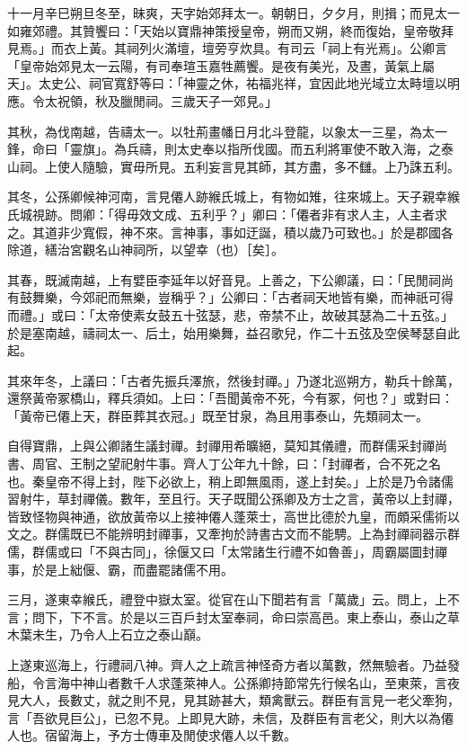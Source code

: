 \begin{pinyinscope}
十一月辛巳朔旦冬至，昧爽，天字始郊拜太一。朝朝日，夕夕月，則揖；而見太一如雍郊禮。其贊饗曰：「天始以寶鼎神策授皇帝，朔而又朔，終而復始，皇帝敬拜見焉。」而衣上黃。其祠列火滿壇，壇旁亨炊具。有司云「祠上有光焉」。公卿言「皇帝始郊見太一云陽，有司奉瑄玉嘉牲薦饗。是夜有美光，及晝，黃氣上屬天」。太史公、祠官寬舒等曰：「神靈之休，祐福兆祥，宜因此地光域立太畤壇以明應。令太祝領，秋及臘閒祠。三歲天子一郊見。」

其秋，為伐南越，告禱太一。以牡荊畫幡日月北斗登龍，以象太一三星，為太一鋒，命曰「靈旗」。為兵禱，則太史奉以指所伐國。而五利將軍使不敢入海，之泰山祠。上使人隨驗，實毋所見。五利妄言見其師，其方盡，多不讎。上乃誅五利。

其冬，公孫卿候神河南，言見僊人跡緱氏城上，有物如雉，往來城上。天子親幸緱氏城視跡。問卿：「得毋效文成、五利乎？」卿曰：「僊者非有求人主，人主者求之。其道非少寬假，神不來。言神事，事如迂誕，積以歲乃可致也。」於是郡國各除道，繕治宮觀名山神祠所，以望幸（也）［矣］。

其春，既滅南越，上有嬖臣李延年以好音見。上善之，下公卿議，曰：「民閒祠尚有鼓舞樂，今郊祀而無樂，豈稱乎？」公卿曰：「古者祠天地皆有樂，而神祇可得而禮。」或曰：「太帝使素女鼓五十弦瑟，悲，帝禁不止，故破其瑟為二十五弦。」於是塞南越，禱祠太一、后土，始用樂舞，益召歌兒，作二十五弦及空侯琴瑟自此起。

其來年冬，上議曰：「古者先振兵澤旅，然後封禪。」乃遂北巡朔方，勒兵十餘萬，還祭黃帝冢橋山，釋兵須如。上曰：「吾聞黃帝不死，今有冢，何也？」或對曰：「黃帝已僊上天，群臣葬其衣冠。」既至甘泉，為且用事泰山，先類祠太一。

自得寶鼎，上與公卿諸生議封禪。封禪用希曠絕，莫知其儀禮，而群儒采封禪尚書、周官、王制之望祀射牛事。齊人丁公年九十餘，曰：「封禪者，合不死之名也。秦皇帝不得上封，陛下必欲上，稍上即無風雨，遂上封矣。」上於是乃令諸儒習射牛，草封禪儀。數年，至且行。天子既聞公孫卿及方士之言，黃帝以上封禪，皆致怪物與神通，欲放黃帝以上接神僊人蓬萊士，高世比德於九皇，而頗采儒術以文之。群儒既已不能辨明封禪事，又牽拘於詩書古文而不能騁。上為封禪祠器示群儒，群儒或曰「不與古同」，徐偃又曰「太常諸生行禮不如魯善」，周霸屬圖封禪事，於是上絀偃、霸，而盡罷諸儒不用。

三月，遂東幸緱氏，禮登中嶽太室。從官在山下聞若有言「萬歲」云。問上，上不言；問下，下不言。於是以三百戶封太室奉祠，命曰崇高邑。東上泰山，泰山之草木葉未生，乃令人上石立之泰山巔。

上遂東巡海上，行禮祠八神。齊人之上疏言神怪奇方者以萬數，然無驗者。乃益發船，令言海中神山者數千人求蓬萊神人。公孫卿持節常先行候名山，至東萊，言夜見大人，長數丈，就之則不見，見其跡甚大，類禽獸云。群臣有言見一老父牽狗，言「吾欲見巨公」，已忽不見。上即見大跡，未信，及群臣有言老父，則大以為僊人也。宿留海上，予方士傳車及閒使求僊人以千數。


\end{pinyinscope}
